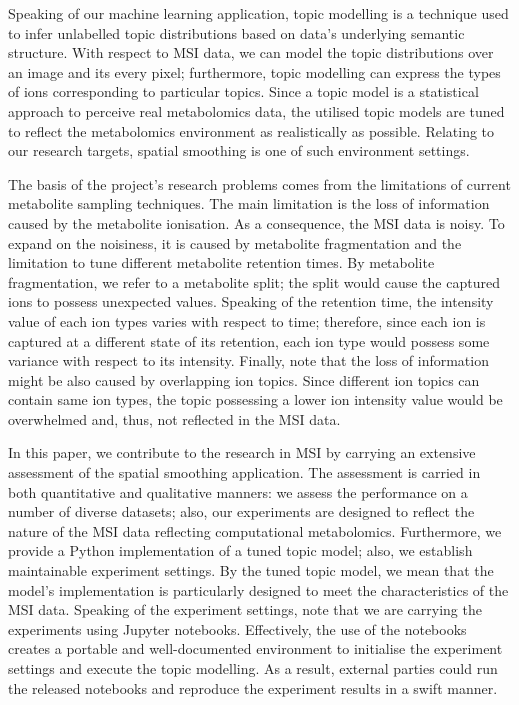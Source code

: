 \documentclass{mpaper}
\begin{document}
\par Speaking of our machine learning application, topic modelling is a technique used to infer unlabelled topic distributions based on data's underlying semantic structure. With respect to MSI data, we can model the topic distributions over an image and its every pixel; furthermore, topic modelling can express the types of ions corresponding to particular topics. Since a topic model is a statistical approach to perceive real metabolomics data, the utilised topic models are tuned to reflect the metabolomics environment as realistically as possible. Relating to our research targets, spatial smoothing is one of such environment settings.

\par The basis of the project's research problems comes from the limitations of current metabolite sampling techniques. The main limitation is the loss of information caused by the metabolite ionisation. As a consequence, the MSI data is noisy. To expand on the noisiness, it is caused by metabolite fragmentation and the limitation to tune different metabolite retention times. By metabolite fragmentation, we refer to a metabolite split; the split would cause the captured ions to possess unexpected values. Speaking of the retention time, the intensity value of each ion types varies with respect to time; therefore, since each ion is captured at a different state of its retention, each ion type would possess some variance with respect to its intensity. Finally, note that the loss of information might be also caused by overlapping ion topics. Since different ion topics can contain same ion types, the topic possessing a lower ion intensity value would be overwhelmed and, thus, not reflected in the MSI data.
\par In this paper, we contribute to the research in MSI by carrying an extensive assessment of the spatial smoothing application. The assessment is carried in both quantitative and qualitative manners: we assess the performance on a number of diverse datasets; also, our experiments are designed to reflect the nature of the MSI data reflecting computational metabolomics. Furthermore, we provide a Python implementation of a tuned topic model; also, we establish maintainable experiment settings. By the tuned topic model, we mean that the model's implementation is particularly designed to meet the characteristics of the MSI data. Speaking of the experiment settings, note that we are carrying the experiments using Jupyter notebooks. Effectively, the use of the notebooks creates a portable and well-documented environment to initialise the experiment settings and execute the topic modelling. As a result, external parties could run the released notebooks and reproduce the experiment results in a swift manner.
\end{document}
